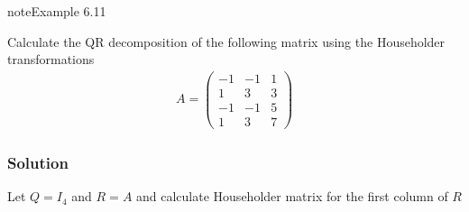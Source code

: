 \documentclass[letterpaper,10pt,english]{jupyterBook}
\begin{document}
\begin{sphinxadmonition}{note}{Example 6.11}

\sphinxAtStartPar
Calculate the QR decomposition of the following matrix using the Householder transformations
\begin{align*}
    A=\begin{pmatrix}
        -1 & -1 & 1\\
        1 & 3 & 3\\
        -1 & -1 & 5\\
        1 & 3 & 7
        \end{pmatrix}
\end{align*}\subsubsection*{Solution}

\sphinxAtStartPar
Let \(Q=I_4\) and \(R=A\) and calculate Householder matrix for the first column of \(R\)


\end{sphinxadmonition}
\end{document}
